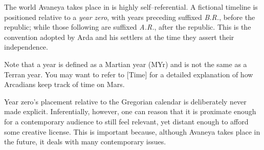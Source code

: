 
The world Avaneya takes place in is highly self--referential. A fictional timeline is positioned relative to a {\it year zero}, with years preceding suffixed {\it B.R.}, before the republic; while those following are suffixed {\it A.R.}, after the republic. This is the convention adopted by Arda and his settlers at the time they assert their independence.

Note that a year is defined as a Martian year (MYr) and is not the same as a Terran year. You may want to refer to [Time] for a detailed explanation of how Arcadians keep track of time on Mars.

Year zero's placement relative to the Gregorian calendar is deliberately never made explicit. Inferentially, however, one can reason that it is proximate enough for a contemporary audience to still feel relevant, yet distant enough to afford some creative license. This is important because, although Avaneya takes place in the future, it deals with many contemporary issues.

\startlines
\page 
\page 
\page 
\page 
\page 
\page 
\page 
\page 
\stoplines

\StopChapter

